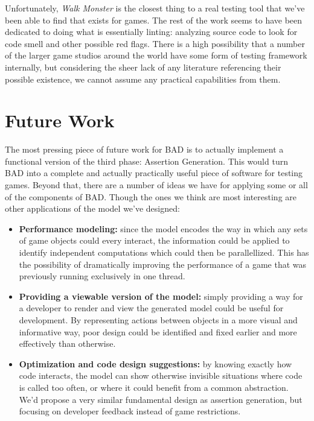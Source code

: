 \documentclass[letterpaper,twocolumn,10pt]{article}
\begin{document}
Unfortunately, \textit{Walk Monster} is the closest thing to a real testing tool that we've been able to find that exists for games. The rest of the work seems to have been dedicated to doing what is essentially linting: analyzing source code to look for code smell and other possible red flags. There is a high possibility that a number of the larger game studios around the world have some form of testing framework internally, but considering the sheer lack of any literature referencing their possible existence, we cannot assume any practical capabilities from them.\\

\section{Future Work}

The most pressing piece of future work for BAD is to actually implement a functional version of the third phase: Assertion Generation. This would turn BAD into a complete and actually practically useful piece of software for testing games. Beyond that, there are a number of ideas we have for applying some or all of the components of BAD. Though the ones we think are most interesting are other applications of the model we've designed:

\begin{itemize}
    \item{\textbf{Performance modeling:}} since the model encodes the way in which any sets of game objects could every interact, the information could be applied to identify independent computations which could then be parallellized. This has the possibility of dramatically improving the performance of a game that was previously running exclusively in one thread.  
    \item {\textbf{Providing a viewable version of the model:}} simply providing a way for a developer to render and view the generated model could be useful for development. By representing actions between objects in a more visual and informative way, poor design could be identified and fixed earlier and more effectively than otherwise.
    \item{\textbf{Optimization and code design suggestions:}} by knowing exactly how code interacts, the model can show otherwise invisible situations where code is called too often, or where it could benefit from a common abstraction. We'd propose a very similar fundamental design as assertion generation, but focusing on developer feedback instead of game restrictions.
\end{itemize}
\end{document}
